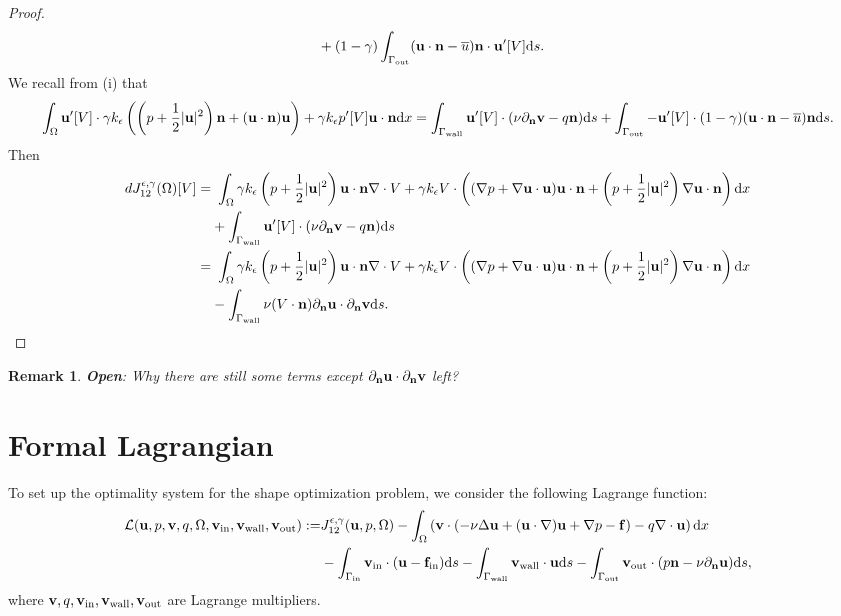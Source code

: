 \documentclass[oneside,11pt]{book}
\numberwithin{equation}{section}
\newtheorem{remark}{Remark}[section]
\begin{document}
\begin{proof}
\begin{align}
        &+ (1 - \gamma)\int_{\Gamma_{\rm out}} ({\bf u}\cdot{\bf n} - \overline{u}){\bf n}\cdot{\bf u}'[V]{\rm d}s.
    \end{align}
    We recall from (i) that
    \begin{align*}
        \int_\Omega {\bf u}'[V]\cdot\gamma k_\epsilon\left(\left(p + \frac{1}{2}|{\bf u}|^2\right){\bf n} + ({\bf u}\cdot{\bf n}){\bf u}\right) + \gamma k_\epsilon p'[V]{\bf u}\cdot{\bf n}{\rm d}x = \int_{\Gamma_{\rm wall}} {\bf u}'[V]\cdot(\nu\partial_{\bf n}{\bf v} - q{\bf n}){\rm d}s + \int_{\Gamma_{\rm out}} -{\bf u}'[V]\cdot(1 - \gamma)({\bf u}\cdot{\bf n} - \overline{u}){\bf n}{\rm d}s.
    \end{align*}
    Then
    \begin{align*}
        dJ_{12}^{\epsilon,\gamma}(\Omega)[V] =&\ \int_\Omega \gamma k_\epsilon\left(p + \frac{1}{2}|{\bf u}|^2\right){\bf u}\cdot{\bf n}\nabla\cdot V + \gamma k_\epsilon V\cdot\left((\nabla p + \nabla{\bf u}\cdot{\bf u}){\bf u}\cdot{\bf n} + \left(p + \frac{1}{2}|{\bf u}|^2\right)\nabla{\bf u}\cdot{\bf n}\right){\rm d}x\\
        &+ \int_{\Gamma_{\rm wall}} {\bf u}'[V]\cdot(\nu\partial_{\bf n}{\bf v} - q{\bf n}){\rm d}s\\
        =&\ \int_\Omega \gamma k_\epsilon\left(p + \frac{1}{2}|{\bf u}|^2\right){\bf u}\cdot{\bf n}\nabla\cdot V + \gamma k_\epsilon V\cdot\left((\nabla p + \nabla{\bf u}\cdot{\bf u}){\bf u}\cdot{\bf n} + \left(p + \frac{1}{2}|{\bf u}|^2\right)\nabla{\bf u}\cdot{\bf n}\right){\rm d}x\\
        &- \int_{\Gamma_{\rm wall}} \nu(V\cdot{\bf n})\partial_{\bf n}{\bf u}\cdot\partial_{\bf n}{\bf v}{\rm d}s.
    \end{align*}
\end{proof}

\begin{remark}
    \textbf{Open}: Why there are still some terms except $\partial_{\bf n}{\bf u}\cdot\partial_{\bf n}{\bf v}$ left?
\end{remark}

\section{Formal Lagrangian}
To set up the optimality system for the shape optimization problem, we consider the following Lagrange function:
\begin{align}
    \label{full Lagrangian}
    \mathcal{L}({\bf u},p,{\bf v},q,\Omega,{\bf v}_{\rm in},{\bf v}_{\rm wall},{\bf v}_{\rm out}) :=& J_{12}^{\epsilon,\gamma}({\bf u},p,\Omega) - \int_\Omega \left({\bf v}\cdot(-\nu\Delta{\bf u} + ({\bf u}\cdot\nabla){\bf u} + \nabla p - {\bf f}) - q\nabla\cdot{\bf u}\right){\rm d}x \nonumber\\
    &- \int_{\Gamma_{\rm in}} {\bf v}_{\rm in}\cdot({\bf u} - {\bf f}_{\rm in}){\rm d}s - \int_{\Gamma_{\rm wall}} {\bf v}_{\rm wall}\cdot{\bf u}{\rm d}s - \int_{\Gamma_{\rm out}} {\bf v}_{\rm out}\cdot(p{\bf n} - \nu\partial_{\bf n}{\bf u}){\rm d}s,
\end{align}
where ${\bf v},q,{\bf v}_{\rm in},{\bf v}_{\rm wall},{\bf v}_{\rm out}$ are Lagrange multipliers.
\end{document}
